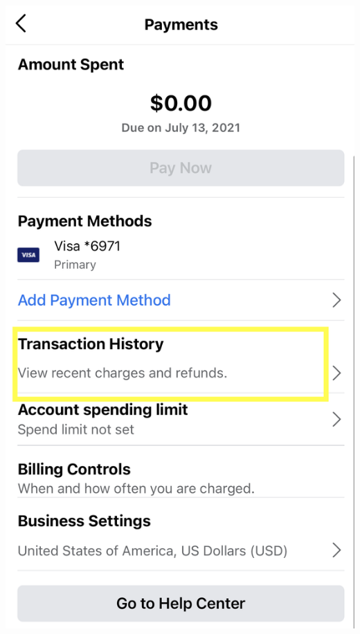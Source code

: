 \documentclass[]{book}
\begin{document}
\begin{enumerate}
  \includegraphics{images/lab_protocols/ig_pay/ig_4.png}
\end{enumerate}
\end{document}
